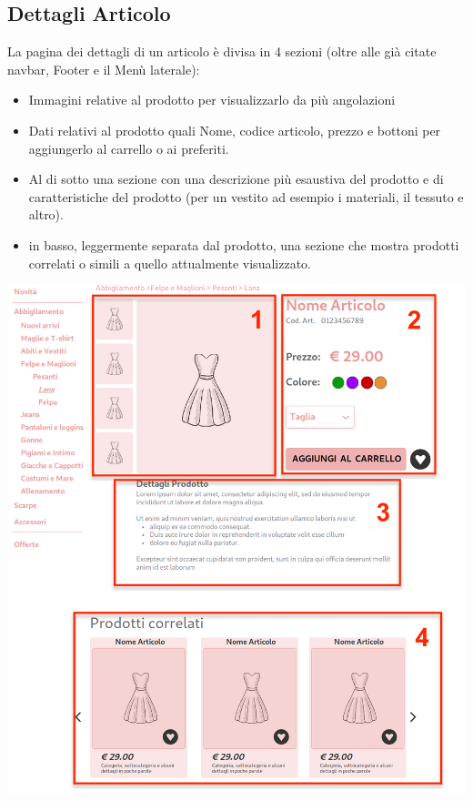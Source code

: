 \documentclass[12pt,a4paper]{report}
\begin{document}
\subsection{Dettagli Articolo}
La pagina dei dettagli di un articolo è divisa in 4 sezioni (oltre alle già citate navbar, Footer e il Menù laterale):
\begin{itemize}
  \item Immagini relative al prodotto per visualizzarlo da più angolazioni
  \item Dati relativi al prodotto quali Nome, codice articolo, prezzo e bottoni per aggiungerlo al carrello o ai preferiti.
  \item Al di sotto una sezione con una descrizione più esaustiva del prodotto e di caratteristiche del prodotto (per un vestito ad esempio i materiali, il tessuto e altro).
  \item in basso, leggermente separata dal prodotto, una sezione che mostra prodotti correlati o simili a quello attualmente visualizzato.
\end{itemize}
\begin{center}
\includegraphics[height=0.9\textheight]{"Images Latex/Immagini Wireframe/Desktop/7 - Dettagli Prodotto (1)"}
\end{center}
\end{document}
